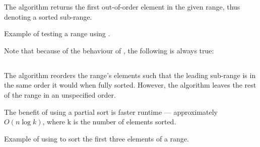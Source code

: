 The  algorithm returns the first out-of-order element in the given range, thus denoting a sorted sub-range.


\begin{codebox}[]{\href{https://compiler-explorer.com/z/48PaYE9Ej}{\ExternalLink}}
\footnotesize Example of testing a range using .
\tcblower
{}
\end{codebox}

Note that because of the behaviour of , the following is always true:\\
\begin{small}\end{small}

\subsection{\texorpdfstring{}{\texttt{std::partial\_sort}}}

The  algorithm reorders the range's elements such that the leading sub-range is in the same order it would when fully sorted. However, the algorithm leaves the rest of the range in an unspecified order.



The benefit of using a partial sort is faster runtime — approximately $O(n \log k)$, where k is the number of elements sorted.

\begin{codebox}[]{\href{https://compiler-explorer.com/z/Th9YTzGsM}{\ExternalLink}}
\footnotesize Example of using  to sort the first three elements of a range.
\tcblower
{}
\end{codebox}

\subsection{\texorpdfstring{}{\texttt{std::partial\_sort\_copy}}}

